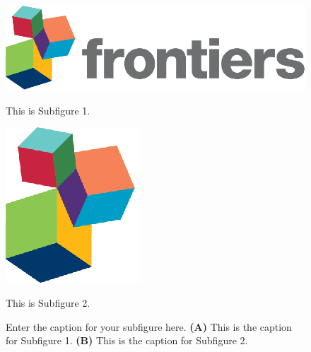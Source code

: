 \documentclass[utf8]{FrontiersinVancouver} %
\begin{document}
\setcounter{figure}{2}
\setcounter{subfigure}{0}
\begin{subfigure}
\setcounter{figure}{2}
\setcounter{subfigure}{0}
    \centering
    \begin{minipage}[b]{0.5\textwidth}
        \includegraphics[width=\linewidth]{logo1.eps}
        \caption{This is Subfigure 1.}
        \label{fig:Subfigure 1}
    \end{minipage}  
   
\setcounter{figure}{2}
\setcounter{subfigure}{1}
    \begin{minipage}[b]{0.5\textwidth}
        \includegraphics[width=\linewidth]{logo2.eps}
        \caption{This is Subfigure 2.}
        \label{fig:Subfigure 2}
    \end{minipage}

\setcounter{figure}{2}
\setcounter{subfigure}{-1}
    \caption{Enter the caption for your subfigure here. \textbf{(A)} This is the caption for Subfigure 1. \textbf{(B)} This is the caption for Subfigure 2.}
    \label{fig: subfigures}
\end{subfigure}
\end{document}
